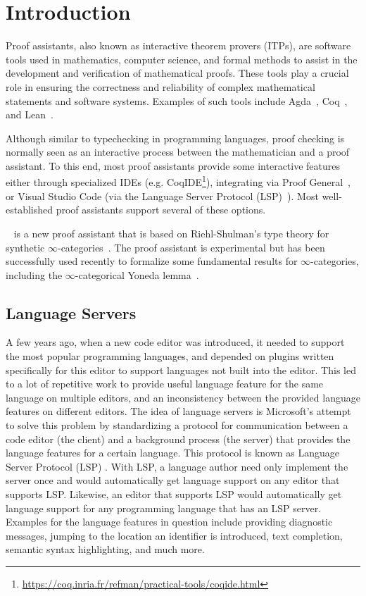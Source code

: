\chapter{Introduction}
\label{chap:intro}

Proof assistants, also known as interactive theorem provers (ITPs),
are software tools used in mathematics, computer science, and formal methods
to assist in the development and verification of mathematical proofs.
These tools play a crucial role in ensuring the correctness and reliability
of complex mathematical statements and software systems.
Examples of such tools include Agda~\cite{BoveDybjerNorell2009}, Coq~\cite{BertotCasteran2013}, and Lean~\cite{deMouraUllrich2021}.

Although similar to typechecking in programming languages,
proof checking is normally seen as an interactive process between the mathematician and a proof assistant.
To this end, most proof assistants provide some interactive features either through specialized IDEs
(e.g. CoqIDE\footnote{\url{https://coq.inria.fr/refman/practical-tools/coqide.html}}),
integrating via Proof General~\cite{Aspinall2000}, or Visual Studio Code
(via the Language Server Protocol (LSP)~\cite{Gunasinghe2022}).
Most well-established proof assistants support several of these options.

\Rzk{}~\cite{Kudasov2023-github-rzk} is a new proof assistant that is based on Riehl-Shulman's type theory for synthetic $\infty$-categories~\cite{Riehl2017}.
The proof assistant is experimental but has been successfully used recently to formalize some fundamental results for $\infty$-categories,
including the $\infty$-categorical Yoneda lemma~\cite{Kudasov2023}.

\section{Language Servers}

A few years ago, when a new code editor was introduced,
it needed to support the most popular programming languages,
and depended on plugins written specifically for this editor to support languages not built into the editor.
This led to a lot of repetitive work to provide useful language feature for the same language on multiple editors,
and an inconsistency between the provided language features on different editors.
The idea of language servers is Microsoft's attempt to solve this problem by standardizing a protocol for communication between a code editor (the client) and a background process (the server) that provides the language features for a certain language. This protocol is known as Language Server Protocol (LSP) \cite{Gunasinghe2022}. With LSP, a language author need only implement the server once and would automatically get language support on any editor that supports LSP. Likewise, an editor that supports LSP would automatically get language support for any programming language that has an LSP server. Examples for the language features in question include providing diagnostic messages, jumping to the location an identifier is introduced, text completion, semantic syntax highlighting, and much more.

